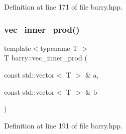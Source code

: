 Definition at line 171 of file barry.\+hpp.

\mbox{\label{namespacebarry_a0343fb4152724d5fa1ffa00d4b6182d9}} 
\subsubsection{\texorpdfstring{vec\+\_\+inner\+\_\+prod()}{vec\_inner\_prod()}}
{\footnotesize\ttfamily template$<$typename T $>$ \\
T barry\+::vec\+\_\+inner\+\_\+prod (\begin{DoxyParamCaption}\item[{const std\+::vector$<$ T $>$ \&}]{a,  }\item[{const std\+::vector$<$ T $>$ \&}]{b }\end{DoxyParamCaption})\hspace{0.3cm}{\ttfamily [inline]}}



Definition at line 191 of file barry.\+hpp.

